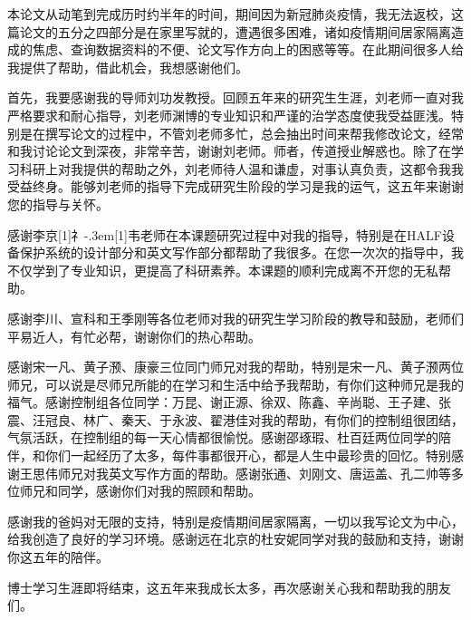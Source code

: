 
\begin{acknowledgements}

本论文从动笔到完成历时约半年的时间，期间因为新冠肺炎疫情，我无法返校，这篇论文的五分之四部分是在家里写就的，遭遇很多困难，诸如疫情期间居家隔离造成的焦虑、查询数据资料的不便、论文写作方向上的困惑等等。在此期间很多人给我提供了帮助，借此机会，我想感谢他们。

首先，我要感谢我的导师刘功发教授。回顾五年来的研究生生涯，刘老师一直对我严格要求和耐心指导，刘老师渊博的专业知识和严谨的治学态度使我受益匪浅。特别是在撰写论文的过程中，不管刘老师多忙，总会抽出时间来帮我修改论文，经常和我讨论论文到深夜，非常辛苦，谢谢刘老师。师者，传道授业解惑也。除了在学习科研上对我提供的帮助之外，刘老师待人温和谦虚，对事认真负责，这都令我我受益终身。能够刘老师的指导下完成研究生阶段的学习是我的运气，这五年来谢谢您的指导与关怀。

感谢李京\hbox{\scalebox{0.7}[1]{礻}\kern-.3em\scalebox{0.6}[1]{韦}}老师在本课题研究过程中对我的指导，特别是在HALF设备保护系统的设计部分和英文写作部分都帮助了我很多。在您一次次的指导中，我不仅学到了专业知识，更提高了科研素养。本课题的顺利完成离不开您的无私帮助。

感谢李川、宣科和王季刚等各位老师对我的研究生学习阶段的教导和鼓励，老师们平易近人，有忙必帮，谢谢你们的热心帮助。

感谢宋一凡、黄子滪、康豪三位同门师兄对我的帮助，特别是宋一凡、黄子滪两位师兄，可以说是尽师兄所能的在学习和生活中给予我帮助，有你们这种师兄是我的福气。感谢控制组各位同学：万昆、谢正源、徐双、陈鑫、辛尚聪、王子建、张震、汪冠良、林广、秦天、于永波、翟港佳对我的帮助，有你们的控制组很团结，气氛活跃，在控制组的每一天心情都很愉悦。感谢邵琢瑕、杜百廷两位同学的陪伴，和你们一起经历了太多，每件事都很开心，都是人生中最珍贵的回忆。特别感谢王思伟师兄对我英文写作方面的帮助。感谢张通、刘刚文、唐运盖、孔二帅等多位师兄和同学，感谢你们对我的照顾和帮助。

感谢我的爸妈对无限的支持，特别是疫情期间居家隔离，一切以我写论文为中心，给我创造了良好的学习环境。感谢远在北京的杜安妮同学对我的鼓励和支持，谢谢你这五年的陪伴。

博士学习生涯即将结束，这五年来我成长太多，再次感谢关心我和帮助我的朋友们。


\end{acknowledgements}
